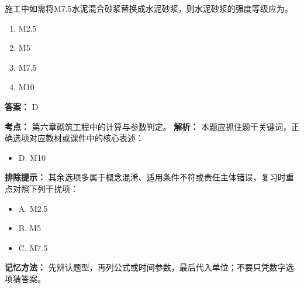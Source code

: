 \documentclass[UTF8,fontset=fandol,11pt]{ctexart}
\begin{document}
\vspace{0.2em}

\begin{quizbox}[title={第 6 题}]
施工中如需将M7.5水泥混合砂浆替换成水泥砂浆，则水泥砂浆的强度等级应为。\\
\begin{enumerate}[label=\Alph*.]
\item M2.5
\item M5
\item M7.5
\item M10
\end{enumerate}
\textbf{答案：} D
\vspace{0.25em}
\begin{answerbox}[title={考点解析}]
\textbf{考点：} 第六章砌筑工程中的计算与参数判定。
\textbf{解析：} 本题应抓住题干关键词，正确选项对应教材或课件中的核心表述：
\begin{itemize}
\item D. M10
\end{itemize}
\textbf{排除提示：} 其余选项多属于概念混淆、适用条件不符或责任主体错误，复习时重点对照下列干扰项：
\begin{itemize}
\item A. M2.5
\item B. M5
\item C. M7.5
\end{itemize}
\textbf{记忆方法：} 先辨认题型，再列公式或时间参数，最后代入单位；不要只凭数字选项猜答案。
\end{answerbox}
\end{quizbox}

\vspace{0.2em}
\end{document}
